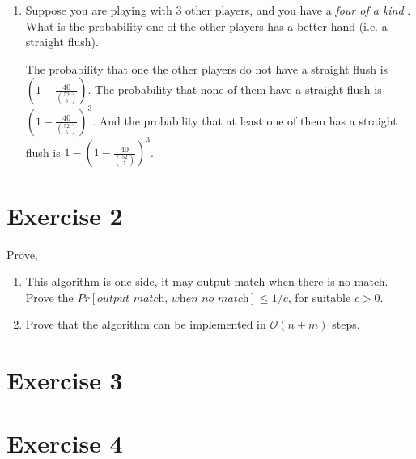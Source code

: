 \documentclass[12pt, a4paper]{article} %
\begin{document}
\begin{enumerate}[label=(\alph*)]
\begin{enumerate}[label=\textbullet]
    \end{enumerate}
  \item Suppose you are playing with 3 other players, and you have a \textit{four of a kind} . What is the probability one of the other players has a better hand (i.e. a straight flush).

    The probability that one the other players do not have a straight flush is $(1 - \frac{40}{\binom{52}{5}})$. The probability that none of them have a straight flush is $(1 - \frac{40}{\binom{52}{5}})^3$. And the probability that at least one of them has a straight flush is $1 - (1 - \frac{40}{\binom{52}{5}})^3$.




\end{enumerate}



\section*{Exercise 2}%
\label{sec:exercise_2}

Prove,

\begin{enumerate}[label=(\alph*)]
  \item This algorithm is one-side, it may output match when there is no match. Prove the $Pr[\textit{output match, when no match}] \leq 1/c$, for suitable $c > 0$.
  \item  Prove that the algorithm can be implemented in $\mathcal{O}(n + m)$ steps.
\end{enumerate}



\section*{Exercise 3}%
\label{sec:exercise_3}


\section*{Exercise 4}%
\label{sec:exercise_4}


%
\end{document}
